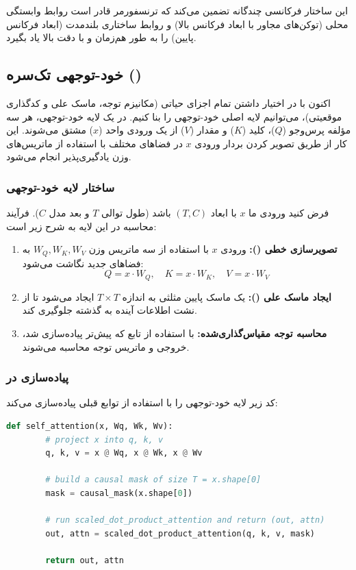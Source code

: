 \documentclass{article}
\begin{document}
این ساختار فرکانسی چندگانه تضمین می‌کند که ترنسفورمر قادر است روابط وابستگی محلی (توکن‌های مجاور با ابعاد فرکانس بالا) و روابط ساختاری بلندمدت (ابعاد فرکانس پایین) را به طور هم‌زمان و با دقت بالا یاد بگیرد.


\subsection{خود-توجهی تک‌سره ()}

اکنون با در اختیار داشتن تمام اجزای حیاتی (مکانیزم توجه، ماسک علی و کدگذاری موقعیتی)، می‌توانیم لایه اصلی خود-توجهی را بنا کنیم. در یک لایه خود-توجهی، هر سه مؤلفه پرس‌وجو ($Q$)، کلید ($K$) و مقدار ($V$) از یک ورودی واحد ($x$) مشتق می‌شوند. این کار از طریق تصویر کردن بردار ورودی $x$ در فضاهای مختلف با استفاده از ماتریس‌های وزن یادگیری‌پذیر انجام می‌شود.

\subsubsection*{ساختار لایه خود-توجهی}

فرض کنید ورودی ما $x$ با ابعاد $(T, C)$ باشد (طول توالی $T$ و بعد مدل $C$). فرآیند محاسبه در این لایه به شرح زیر است:
\begin{enumerate}
	\item \textbf{تصویرسازی خطی ():} ورودی $x$ با استفاده از سه ماتریس وزن $W_Q, W_K, W_V$ به فضاهای جدید نگاشت می‌شود:
	\[ Q = x \cdot W_Q, \quad K = x \cdot W_K, \quad V = x \cdot W_V \]
	\item \textbf{ایجاد ماسک علی ():} یک ماسک  پایین مثلثی  به اندازه $T \times T$ ایجاد می‌شود تا از نشت اطلاعات آینده به گذشته جلوگیری کند.
	\item \textbf{محاسبه توجه مقیاس‌گذاری‌شده:} با استفاده از تابع  که پیش‌تر پیاده‌سازی شد، خروجی و ماتریس توجه محاسبه می‌شوند.
\end{enumerate}

\subsubsection*{پیاده‌سازی در }

کد زیر لایه خود-توجهی را با استفاده از توابع قبلی پیاده‌سازی می‌کند:


\begin{latin}
	\begin{lstlisting}[language=Python, basicstyle=\ttfamily\scriptsize]
		def self_attention(x, Wq, Wk, Wv):
		# project x into q, k, v
		q, k, v = x @ Wq, x @ Wk, x @ Wv
		
		# build a causal mask of size T = x.shape[0]
		mask = causal_mask(x.shape[0])
		
		# run scaled_dot_product_attention and return (out, attn)
		out, attn = scaled_dot_product_attention(q, k, v, mask)
		
		return out, attn
	\end{lstlisting}
\end{latin}
\end{document}
